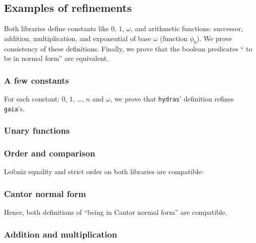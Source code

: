 

\subsection{Examples of refinements}
Both libraries define constants like $0$, $1$, $\omega$, and arithmetic functions: successor, addition, multiplication, and exponential of base $\omega$ (function $\phi_0$). We prove consistency of these definitions. Finally, we prove that the boolean predicates `` to be in normal form'' are equivalent.

\subsubsection{A few constants}
For each constant: $0$, $1$, \dots, $n$ and $\omega$, we prove
that \texttt{hydras}' definition refines \texttt{gaia}'s.


\subsubsection{Unary functions}


\subsubsection{Order and comparison}
Leibniz equality and strict order on both libraries are
compatible:



\label{sect:gaia-compare-ref}



\subsubsection{Cantor normal form}

Hence, both definitions of ``being in Cantor normal form'' are
compatible.



\subsubsection{Addition and multiplication}

